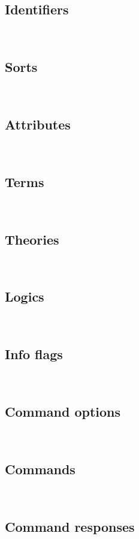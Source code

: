 {\sexpressions


\subsection*{Identifiers}
\ 

\cIdentifiers

\newpage
\subsection*{Sorts}
\ 

\cSorts
\medskip


\subsection*{Attributes}
\ 

\cAttributes
\medskip


\subsection*{Terms}
\ 

\cTerms

\newpage
\subsection*{Theories}
\ 

\cTheories
\medskip

\subsection*{Logics}
\ 

\cLogics
\medskip

\newpage
\subsection*{Info flags}
\ 

\cInfoFlags
\medskip

\subsection*{Command options}
\ 

\cCommandOptions

\newpage
\subsection*{Commands}
\ 

\cCommands

\newpage
\subsection*{Command responses}
\ 

\cResponsesI

\cResponsesII
}




